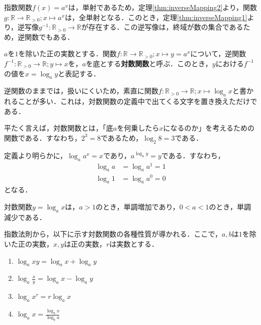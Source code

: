 指数関数$f(x) = a^x$は，単射であるため，定理\ref{thm:inverseMapping2}より，関数$g : \mathbb{R} \rightarrow \mathbb{R}_{>0}; x \mapsto a^x$は，全単射となる．このとき，定理\ref{thm:inverseMapping1}より，逆写像$g^{-1} : \mathbb{R}_{>0} \rightarrow \mathbb{R}$が存在する．この逆写像は，終域が数の集合であるため，逆関数でもある．
\begin{definition}[対数関数]
	$a$を$1$を除いた正の実数とする．関数$f : \mathbb{R} \rightarrow \mathbb{R}_{>0}; x \mapsto y = a^x$について，逆関数$f^{-1} : \mathbb{R}_{>0} \rightarrow \mathbb{R}; y \mapsto x$を，$a$を底とする\textbf{対数関数}と呼ぶ．このとき，$y$における$f^{-1}$の値を$x = \log_a y$と表記する．
\end{definition}
\begin{rem*}
	逆関数のままでは，扱いにくいため，素直に関数$f : \mathbb{R}_{>0} \rightarrow \mathbb{R}; x \mapsto \log_a x$と書かれることが多い．これは，対数関数の定義中で出てくる文字を置き換えただけである．
\end{rem*}
\begin{rem*}
	平たく言えば，対数関数とは，「底$a$を何乗したら$x$になるのか」を考えるための関数である．すなわち，$2^3 = 8$であるため，$\log_2 8 = 3$である．
\end{rem*}
\begin{rem*}
	定義より明らかに，$\log_a a^x = x$であり，$a^{\log_a y} = y$である．すなわち，
	\begin{align*}
		\log_a a &= \log_a a^1 = 1 \\
		\log_a 1 &= \log_a a^0 = 0
	\end{align*}
	となる．
\end{rem*}
\begin{rem*}
	対数関数$y = \log_a x$は，$a > 1$のとき，単調増加であり，$0 < a < 1$のとき，単調減少である．
\end{rem*}

\begin{theorem}
	指数法則から，以下に示す対数関数の各種性質が導かれる．ここで，$a, b$は$1$を除いた正の実数，$x, y$は正の実数，$r$は実数とする．
	\begin{enumerate}[itemsep=2ex, label*=\arabic*.]
		\item $\log_a xy = \log_a x + \log_a y$
		\item $\displaystyle \log_a \frac{x}{y} = \log_a x - \log_a y$
		\item $\log_a x^r = r\log_a x$
		\item $\displaystyle \log_a x = \frac{\log_b x}{\log_b a}$
	\end{enumerate}
\end{theorem}


